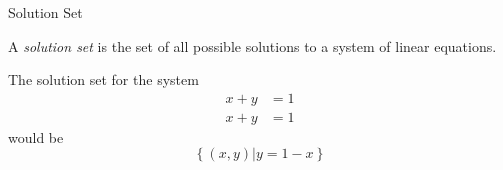 \documentclass[xcoler=dvipsnames, aspectratio=169]{beamer}
\begin{document}
\iftoggle{showSolutions}{
\begin{frame}{Consistency Practice Answers}
    \footnotesize
    \begin{practice}
        Determine if the following systems are consistent or inconsistent
        \begin{columns}
            \column{.45\textwidth}
            \begin{enumerate}
                \item \begin{align*}
                        2x_1 + 4x_2 &= 1\\
                        4x_1 + 8x_2 &= 2
                \end{align*}
                This system is consistent. It has an infinite number of solutions!
                \item \begin{align*}
                        6x_1 + 3x_2 &= 10\\
                        12x_1 + 6x_2 &= 10
                \end{align*}
                This system is inconsistent. There cannot be a solution
            \end{enumerate}
            \column{.45\textwidth}
            \begin{enumerate}\addtocounter{enumi}{2}
                \item \begin{align*}
                        2x_1 + 3x_2 &=0 \\
                         x_1 + 5x_2 &= 0
                \end{align*}
                This system is consistent. It has exactly 1 solution!
                \item \begin{align*}
                        x_1 + x_2 &= 1\\
                        x_1 + x_2 &= 1
                \end{align*}
                This system is consistent. It has an infinite number of solutions!
            \end{enumerate}
        \end{columns}
    \end{practice}
\end{frame}
}{}
\begin{frame}{Solution Set}
    \begin{defn}
        A \textit{solution set} is the set of all possible solutions to a system of 
        linear equations.
    \end{defn}
    \begin{ex}
        The solution set for the system \begin{align*}
                        x + y &= 1\\
                        x + y &= 1
                \end{align*}
                \pause
                would be
                $$\left.\left\{(x,y)\right|y = 1 - x\right\}$$
    \end{ex}
\end{frame}
\end{document}
